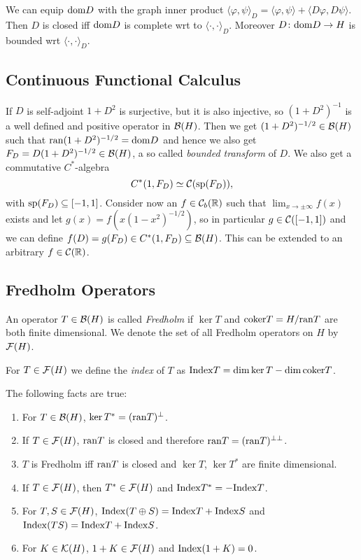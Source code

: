 \noindent We can equip $\dom D$ with the graph inner product $\langle\varphi,\psi\rangle_D=\langle\varphi,\psi\rangle+\langle D\varphi,D\psi\rangle$. Then $D$ is closed iff $\dom D$ is complete wrt to $\langle\cdot,\cdot\rangle_D$. Moreover $D\colon\dom D\to H$ is bounded wrt $\langle\cdot,\cdot\rangle_D$. 

\subsection{Continuous Functional Calculus}
If $D$ is self-adjoint $1+D^2$ is surjective, but it is also injective, so $(1+D^2)^{-1}$ is a well defined and positive operator in $\B(H)$. Then we get $(1+D^2)^{-1/2}\in\B(H)$ such that $\ran(1+D^2)^{-1/2}=\dom D$ and hence we also get $F_D=D(1+D^2)^{-1/2}\in\B(H)$, a so called \emph{bounded transform} of $D$. We also get a commutative $C^\ast$-algebra $$C^\ast(1,F_D)\simeq\Co(\sp(F_D)),$$ with $\sp(F_D)\subseteq [-1,1]$. Consider now an $f\in\Co_b(\Bbb R)$ such that $\lim_{x\to\pm\infty}f(x)$ exists and let $g(x)=f(x(1-x^2)^{-1/2})$, so in particular $g\in\Co([-1,1])$ and we can define $f(D)=g(F_D)\in C^\ast(1,F_D)\subseteq\B(H)$. This can be extended to an arbitrary $f\in\Co(\R)$. 

\subsection{Fredholm Operators}
\begin{definition}
 An operator $T\in\B(H)$ is called \emph{Fredholm} if $\ker T$ and $\coker T=H/\ran T$ are both finite dimensional. We denote the set of all Fredholm operators on $H$ by $\F(H)$.
\end{definition}

\begin{definition}
 For $T\in\F(H)$ we define the \emph{index} of $T$ as $\ind T=\dim\ker T-\dim\coker T$.
\end{definition}
\begin{fact}
 The following facts are true: 
 \begin{enumerate}
  \item For $T\in\B(H)$, $\ker T^\ast=(\ran T)^\perp$.
  \item If $T\in\F(H)$, $\ran T$ is closed and therefore $\ran T=(\ran T)^{\perp\perp}$.
  \item $T$ is Fredholm iff $\ran T$ is closed and $\ker T$, $\ker T^\ast$ are finite dimensional.
  \item If $T\in\F(H)$, then $T^\ast\in\F(H)$ and $\ind T^\ast=-\ind T$.
  \item For $T,S\in\F(H)$, $\ind (T\oplus S)=\ind T+\ind S$ and $\ind(TS)=\ind T+\ind S$.
  \item For $K\in \K(H)$, $1+K\in\F(H)$ and $\ind(1+K)=0$.
 \end{enumerate}
\end{fact}

